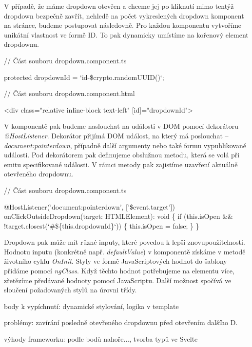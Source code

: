 V případě, že máme dropdown otevřen a chceme jej po kliknutí mimo tentýž dropdown bezpečně zavřít, nehledě na počet vykreslených dropdown komponent na stránce, budeme postupovat následovně. 
Pro každou komponentu vytvoříme unikátní vlastnost ve formě ID. To pak dynamicky umístíme na kořenový element dropdownu.

\begin{prog}
// Část souboru dropdown.component.ts

protected dropdownId = `id-\${crypto.randomUUID()}`;

// Část souboru dropdown.component.html

<div class="relative inline-block text-left" [id]="dropdownId">
\end{prog}

V komponentě pak budeme naslouchat na události v DOM pomocí dekorátoru \emph{@HostListener}. 
Dekorátor přijímá DOM událost, na který má poslouchat -- \emph{document:pointerdown}, případně další argumenty nebo také formu vypublikované události. 
Pod dekorátorem pak definujeme obslužnou metodu, která se volá při emitu specifikované události. V rámci metody pak zajistíme uzavření aktuálně otevřeného dropdownu.

\begin{prog}
// Část souboru dropdown.component.ts

@HostListener('document:pointerdown', ['\$event.target'])
onClickOutsideDropdown(target: HTMLElement): void \{
  if (this.isOpen && !target.closest(`#\$\{this.dropdownId\}`)) \{
    this.isOpen = false;
  \}
\}
\end{prog}

Dropdown pak může mít různé inputy, které povedou k lepší znovupoužitelnosti. Hodnotu inputu (konkrétně např. \emph{defaultValue}) v komponentě získáme v metodě životního cyklu \emph{OnInit}. 
Styly ve formě JavaScriptových hodnot do šablony přidáme pomocí \emph{ngClass}. Když těchto hodnot potřebujeme na elementu více, zřetězíme předávané hodnoty pomocí JavaScriptu. 
Další možnost spočívá ve sloučení požadovaných stylů na úrovni třídy.

\begin{citemize}
	\item body k vypíchnutí: dynamické stylování, logika v template
	\item problémy: zavírání posledně otevřeného dropdownu před otevřením dalšího D.
	\item výhody frameworku: podle bodů nahoře..., tvorba typů ve Svelte
\end{citemize}

